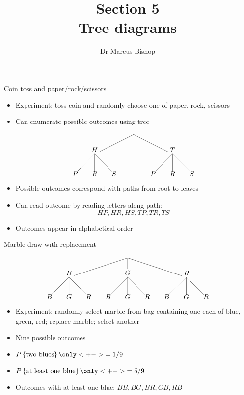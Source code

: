 \documentclass{beamer}
\title[\S5]{Section 5\\Tree diagrams}
\author{Dr Marcus Bishop}
\theoremstyle{definition}
\begin{document}
\begin{frame}\titlepage\end{frame}
\LogoOff

\begin{frame}{Coin toss and paper/rock/scissors}
\begin{itemize}
\item Experiment: toss coin \alert{and} randomly choose
one of paper, rock, scissors
\item Can enumerate possible outcomes using tree
\[\begin{xy}<1cm,0cm>:
(0,0)="0";
(-2,-1)="-21";
(2,-1)="21";
"0";"-21"*+!D{H}**\dir{-};
"0";"21"*+!D{T}**\dir{-};
"-21";(-3,-2)*{P}**\dir{-};
"-21";(-2,-2)*{R}**\dir{-};
"-21";(-1,-2)*{S}**\dir{-};
"21";(1,-2)*{P}**\dir{-};
"21";(2,-2)*{R}**\dir{-};
"21";(3,-2)*{S}**\dir{-};
\end{xy}\]
\item Possible outcomes correspond with paths from root to leaves
\item Can read outcome by reading letters along path:
\[HP,HR,HS,TP,TR,TS\]
\item Outcomes appear in alphabetical order
\end{itemize}
\end{frame}

\begin{frame}{Marble draw with replacement}
\[\begin{xy}<1cm,0cm>:
(0,0)="0";
(-3,-1)="-31";
(0,-1)="01";
(3,-1)="31";
"0";"-31"*+!D{B}**\dir{-};
"0";"01"*+!D{G}**\dir{-};
"0";"31"*+!D{R}**\dir{-};
"-31";(-4,-2)*{B}**\dir{-};
"-31";(-3,-2)*{G}**\dir{-};
"-31";(-2,-2)*{R}**\dir{-};
"01";(-1,-2)*{B}**\dir{-};
"01";(0,-2)*{G}**\dir{-};
"01";(1,-2)*{R}**\dir{-};
"31";(2,-2)*{B}**\dir{-};
"31";(3,-2)*{G}**\dir{-};
"31";(4,-2)*{R}**\dir{-};
\end{xy}\]
\begin{itemize}
\item Experiment: randomly select marble from bag
containing one each of blue, green, red;
\alert{replace marble}; select another
\item Nine possible outcomes
\item $P\left\{\text{two blues}\right\}
\only<+->{=1/9}$
\item $P\left\{\text{at least one blue}\right\}
\only<+->{=5/9}$
\item Outcomes with at least one blue:
$BB,BG,BR,GB,RB$
\end{itemize}
\end{frame}
\end{document}

